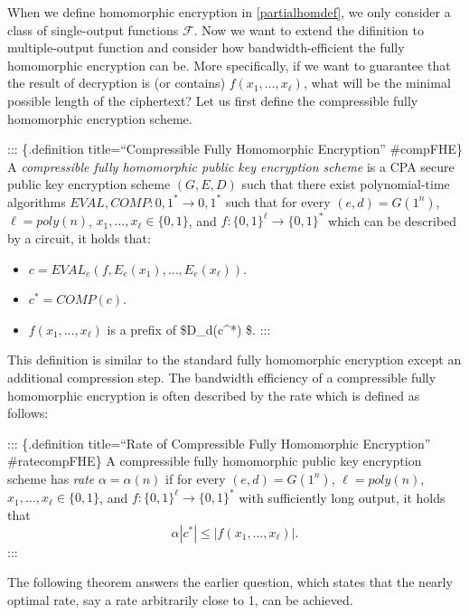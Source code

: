 When we define homomorphic encryption in \cref{partialhomdef}, we only
consider a class of single-output functions \(\mathcal{F}\). Now we want
to extend the difinition to multiple-output function and consider how
bandwidth-efficient the fully homomorphic encryption can be. More
specifically, if we want to guarantee that the result of decryption is
(or contains) \(f(x_1,\ldots,x_\ell)\), what will be the minimal
possible length of the ciphertext? Let us first define the compressible
fully homomorphic encryption scheme.

::: \{.definition title=``Compressible Fully Homomorphic Encryption''
\#compFHE\} A \emph{compressible fully homomorphic public key encryption
scheme} is a CPA secure public key encryption scheme \((G,E,D)\) such
that there exist polynomial-time algorithms
\(\ensuremath{\mathit{EVAL}}, \ensuremath{\mathit{COMP}}:{0,1}^* \rightarrow {0,1}^*\)
such that for every \((e,d)=G(1^n)\), \(\ell=poly(n)\),
\(x_1,\ldots,x_\ell \in \{0,1\}\), and
\(f:\{0,1\}^\ell\rightarrow \{0,1\}^*\) which can be described by a
circuit, it holds that:

\begin{itemize}
\item
  \(c=\ensuremath{\mathit{EVAL}}_e(f,E_e(x_1),\ldots,E_e(x_\ell))\).
\item
  \(c^*=\ensuremath{\mathit{COMP}}(c)\).
\item
  \(f(x_1,\ldots,x_\ell)\) is a prefix of \$D\_d(c\^{}*) \$. :::
\end{itemize}

This definition is similar to the standard fully homomorphic encryption
except an additional compression step. The bandwidth efficiency of a
compressible fully homomorphic encryption is often described by the rate
which is defined as follows:

::: \{.definition title=``Rate of Compressible Fully Homomorphic
Encryption'' \#ratecompFHE\} A compressible fully homomorphic public key
encryption scheme has \emph{rate} \(\alpha=\alpha(n)\) if for every
\((e,d)=G(1^n)\), \(\ell=poly(n)\), \(x_1,\ldots,x_\ell \in \{0,1\}\),
and \(f:\{0,1\}^\ell\rightarrow \{0,1\}^*\) with sufficiently long
output, it holds that \[\alpha |c^*|\leq |f(x_1,\ldots,x_\ell)|.\] :::

The following theorem answers the earlier question, which states that
the nearly optimal rate, say a rate arbitrarily close to 1, can be
achieved.

\hypertarget{optrate}{}

